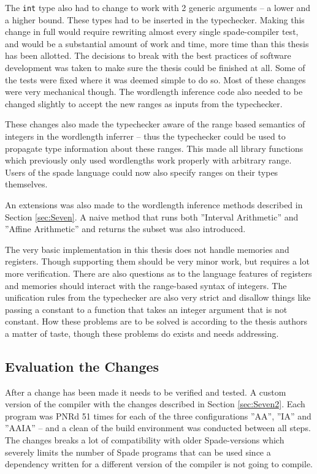 The \verb+int+ type also had to change to work with 2 generic arguments -- a lower and a higher bound. These types had to be inserted in the typechecker. Making this change in full would require rewriting almost every single spade-compiler test, and would be a substantial amount of work and time, more time than this thesis has been allotted. The decisions to break with the best practices of software development was taken to make sure the thesis could be finished at all. Some of the tests were fixed where it was deemed simple to do so. Most of these changes were very mechanical though. The wordlength inference code also needed to be changed slightly to accept the new ranges as inputs from the typechecker.

These changes also made the typechecker aware of the range based semantics of integers in the wordlength inferrer -- thus the typechecker could be used to propagate type information about these ranges. This made all library functions which previously only used wordlengths work properly with arbitrary range. Users of the spade language could now also specify ranges on their types themselves.

An extensions was also made to the wordlength inference methods described in Section \ref{sec:Seven}. A naive method that runs both ''Interval Arithmetic'' and ''Affine Arithmetic'' and returns the subset was also introduced.

The very basic implementation in this thesis does not handle memories and registers. Though supporting them should be very minor work, but requires a lot more verification. There are also questions as to the language features of registers and memories should interact with the range-based syntax of integers. The unification rules from the typechecker are also very strict and disallow things like passing a constant to a function that takes an integer argument that is not constant. How these problems are to be solved is according to the thesis authors a matter of taste, though these problems do exists and needs addressing. 

\subsection{Evaluation the Changes}
After a change has been made it needs to be verified and tested. A custom version of the compiler with the changes described in Section \ref{sec:Seven2}. Each program was PNRd 51 times for each of the three configurations ''AA'', ''IA'' and ''AAIA'' -- and a clean of the build environment was conducted between all steps. The changes breaks a lot of compatibility with older Spade-versions which severely limits the number of Spade programs that can be used since a dependency written for a different version of the compiler is not going to compile.

